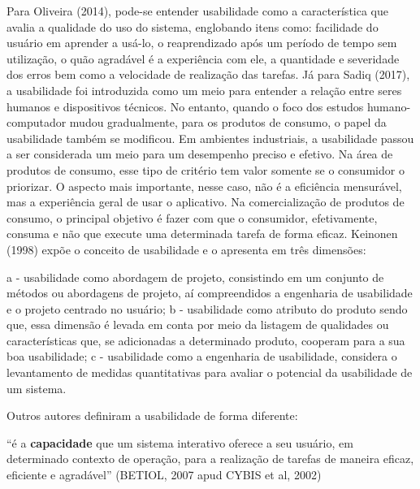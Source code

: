 \indent Para Oliveira (2014), pode-se entender usabilidade como a característica que avalia a qualidade do uso do sistema, englobando itens como: facilidade do usuário em aprender a usá-lo, o reaprendizado após um período de tempo sem utilização, o quão agradável é a experiência com ele, a quantidade e severidade dos erros bem como a velocidade de realização das tarefas.\newline
\indent Já para Sadiq (2017), a usabilidade foi introduzida como um meio para entender a relação entre seres humanos e dispositivos técnicos. No entanto, quando o foco dos estudos humano-computador mudou gradualmente, para os produtos de consumo, o papel da usabilidade também se modificou. Em ambientes industriais, a usabilidade passou a ser considerada um meio para um desempenho preciso e efetivo.\newline
\indent Na área de produtos de consumo, esse tipo de critério tem valor somente se o consumidor o priorizar. O aspecto mais importante, nesse caso, não é a eficiência mensurável, mas a experiência geral de usar o aplicativo. Na comercialização de produtos de consumo, o principal objetivo é fazer com que o consumidor, efetivamente, consuma e não que execute uma determinada tarefa de forma eficaz.\newline
\indent Keinonen (1998) expõe o conceito de usabilidade e o apresenta em três dimensões:
\begin{flushright}
	\begin{minipage}{.96\textwidth}
		a - usabilidade como abordagem de projeto, consistindo em um conjunto de métodos ou abordagens de projeto, aí compreendidos a engenharia de usabilidade e o projeto centrado no usuário;\newline	
		b - usabilidade como atributo do produto sendo que, essa dimensão é levada em conta por meio da listagem de qualidades ou características que, se adicionadas a determinado produto, cooperam para a sua boa usabilidade;\newline
		c - usabilidade como a engenharia de usabilidade, considera o levantamento de medidas quantitativas para avaliar o potencial da usabilidade de um sistema.	
	\end{minipage}	
\end{flushright}

\newline \indent Outros autores definiram a usabilidade de forma diferente:\newline

	{\raggedleft
	\hspace*{4.5cm} 
	\begin{minipage}{0.7\textwidth} 
		“é a \textbf{capacidade} que um sistema interativo oferece a seu usuário, em determinado contexto de operação, para a realização de tarefas de maneira eficaz, eficiente e agradável” (BETIOL, 2007 apud CYBIS et al,  2002) \newline	
	\end{minipage}
	\par}

